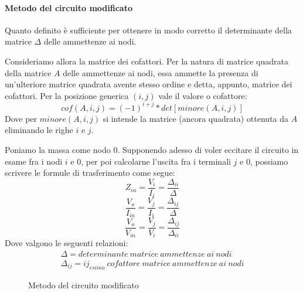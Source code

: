 \paragraph{Metodo del circuito modificato}
Quanto definito è sufficiente per ottenere in modo corretto il determinante della matrice $\Delta$ delle ammettenze ai nodi.

Consideriamo allora la matrice dei cofattori. Per la natura di matrice quadrata della matrice $A$ delle ammettenze ai nodi, essa ammette la presenza di un'ulteriore matrice quadrata avente stesso ordine e detta, appunto, matrice dei cofattori. Per la posizione generica $\left( i, j\right)$ vale il valore o cofattore:
$$ cof\left( A, i, j\right) = (-1)^{i+j}\ast det\left[ minore\left( A, i, j\right)\right] $$
Dove per $minore\left( A, i, j\right)$ si intende la matrice (ancora quadrata) ottenuta da $A$ eliminando le righe $i$ e $j$.

Poniamo la massa come nodo $0$. Supponendo adesso di voler eccitare il circuito in esame fra i nodi $i$ e $0$, per poi calcolarne l'uscita fra i terminali $j$ e $0$, possiamo scrivere le formule di trasferimento come segue:
$$ Z_{in} = \frac{V_i}{I_i} = \frac{\Delta_{ii}}{\Delta} $$
$$ \frac{V_o}{I_{in}} = \frac{V_j}{I_i} = \frac{\Delta_{ij}}{\Delta} $$
$$ \frac{V_o}{V_{in}} = \frac{V_j}{V_i} = \frac{\Delta_{ij}}{\Delta_{ii}} $$
Dove valgono le seguenti relazioni:
$$
\begin{array}{c}
 \Delta = determinante~matrice~ammettenze~ai~nodi\\
 \Delta_{ij} = ij_{esimo}~cofattore~matrice~ammettenze~ai~nodi
\end{array}
$$

\begin{figure}
 \centering
 \hspace{25pt}
 \caption{Metodo del circuito modificato}
 \label{fig:circmet}
\end{figure}

